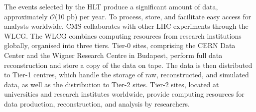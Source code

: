 The events selected by the \ac{HLT} produce a significant amount of data, approximately $\mathcal{O}$(10 pb) per year. 
To process, store, and facilitate easy access for analysts worldwide, \ac{CMS} collaborates with other \ac{LHC} experiments through the \ac{WLCG}. 
The \ac{WLCG} combines computing resources from research institutions globally, organised into three tiers. 
Tier-0 sites, comprising the \ac{CERN} Data Center and the Wigner Research Centre in Budapest, perform full data reconstruction and store a copy of the data on tape. 
The data is then distributed to Tier-1 centres, which handle the storage of raw, reconstructed, and simulated data, as well as the distribution to Tier-2 sites. 
Tier-2 sites, located at universities and research institutes worldwide, provide computing resources for data production, reconstruction, and analysis by researchers.
